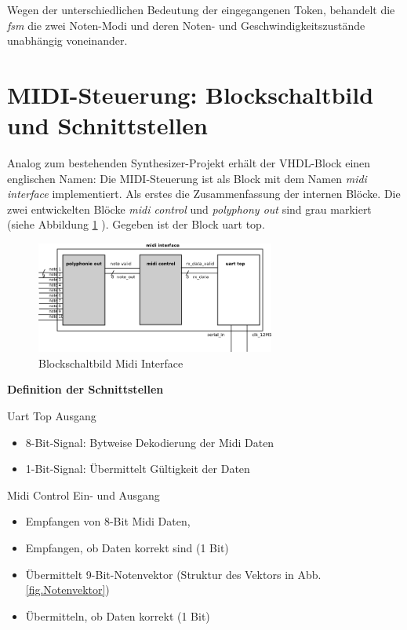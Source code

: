 Wegen der unterschiedlichen Bedeutung der eingegangenen Token, behandelt die \textit{fsm} die zwei Noten-Modi und deren Noten- und Geschwindigkeitszustände unabhängig voneinander.


\section{MIDI-Steuerung: Blockschaltbild und Schnittstellen}

Analog zum bestehenden Synthesizer-Projekt erhält der VHDL-Block einen englischen Namen: Die MIDI-Steuerung ist als Block mit dem Namen \textit{midi interface} implementiert. Als erstes die Zusammenfassung der internen Blöcke. Die zwei entwickelten Blöcke \textit{midi control} und \textit{polyphony out} sind grau markiert (siehe Abbildung \ref{fig.midi_interface_block} ). Gegeben ist der Block uart top.

\begin{figure}[H]
	\includegraphics[width=0.7\textwidth]{images/midi_interface/midi_interface_block.png}
	\caption{Blockschaltbild Midi Interface}
	\label{fig.midi_interface_block}
\end{figure}

\textbf{Definition der Schnittstellen}\label{schnittstellen}

Uart Top Ausgang

\begin{itemize}
	\item 8-Bit-Signal: Bytweise Dekodierung der Midi Daten 
	\item 1-Bit-Signal: Übermittelt Gültigkeit der Daten
\end{itemize}

Midi Control Ein- und Ausgang

\begin{itemize}
	\item Empfangen von 8-Bit Midi Daten,
    \item Empfangen, ob Daten korrekt sind (1 Bit)
	\item Übermittelt 9-Bit-Notenvektor (Struktur des Vektors in Abb.\ref{fig.Notenvektor})
    \item Übermitteln, ob Daten korrekt (1 Bit)
\end{itemize}

